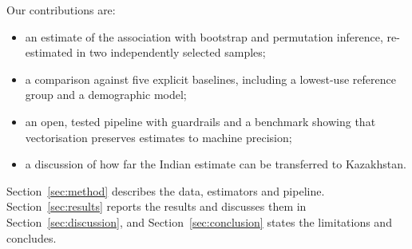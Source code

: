 Our contributions are:
\begin{itemize}
\item an estimate of the association with bootstrap and permutation inference, re-estimated in two independently selected samples;
\item a comparison against five explicit baselines, including a lowest-use reference group and a demographic model;
\item an open, tested pipeline with guardrails and a benchmark showing that vectorisation preserves estimates to machine precision;
\item a discussion of how far the Indian estimate can be transferred to Kazakhstan.
\end{itemize}

Section~\ref{sec:method} describes the data, estimators and pipeline. Section~\ref{sec:results} reports the results and discusses them in Section~\ref{sec:discussion}, and Section~\ref{sec:conclusion} states the limitations and concludes.
